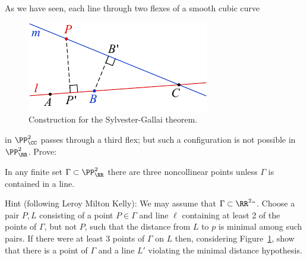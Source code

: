 \begin{exercise}\label{Sylvester-Gallai-Kelly}
As we have seen, each line through two flexes of a smooth  cubic curve 
%
\begin{figure} %
\includegraphics[height=.85in]{main/Sylvester_Gallai_Kelly_proof}
\vskip-8pt
\caption{Construction for the Sylvester-Gallai theorem.}
\label{Fig4-S}
\end{figure}
%
in $\PP^2_\CC$ passes through a third flex; but
such a configuration is not possible in $\PP^2_\RR$. Prove:

\begin{theorem}
In any finite set  $\Gamma \subset \PP^2_\RR$ there are three 
noncollinear points unless $\Gamma$ is contained in a line.
\unif
\end{theorem}

Hint (following Leroy Milton Kelly): 
%
We may assume that $\Gamma\subset \RR^2` `$. Choose a pair $P,L$ consisting of a point $P\in\Gamma$ and line $\ell$ containing at least 2 of the points of $\Gamma$, but not $P$, such that the distance from $L$ to $p$ is
minimal among such pairs. If there were at least 3 points of $\Gamma$
on $L$ then, considering  
Figure~\ref{Fig4-S},
show that
there is a point of $\Gamma$ and a line $L'$ violating the minimal distance hypothesis.
\end{exercise}

